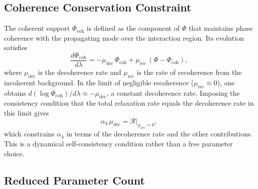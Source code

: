 \documentclass[12pt,a4paper]{article}
\theoremstyle{remark}
\newcommand{\Rcal}{\mathcal{R}}
\begin{document}
\subsection{Coherence Conservation Constraint}

The coherent support $\Phi_{\mathrm{coh}}$ is defined as the component of $\Phi$
that maintains phase coherence with the propagating mode over the interaction
region. Its evolution satisfies
\begin{equation}
\frac{d\Phi_{\mathrm{coh}}}{d\lambda} = -\mu_{\mathrm{dec}}\,\Phi_{\mathrm{coh}} + \mu_{\mathrm{rec}}\,(\Phi - \Phi_{\mathrm{coh}}),
\end{equation}
where $\mu_{\mathrm{dec}}$ is the decoherence rate and $\mu_{\mathrm{rec}}$ is
the rate of recoherence from the incoherent background. In the limit of
negligible recoherence ($\mu_{\mathrm{rec}} \approx 0$), one obtains
$d(\log\Phi_{\mathrm{coh}})/d\lambda \approx -\mu_{\mathrm{dec}}$, a constant
decoherence rate. Imposing the consistency condition that the total relaxation
rate equals the decoherence rate in this limit gives
\begin{equation}
\alpha_4\,\mu_{\mathrm{dec}} = \Rcal\big|_{\mu_{\mathrm{rec}}=0},
\end{equation}
which constrains $\alpha_4$ in terms of the decoherence rate and the other
contributions. This is a dynamical self-consistency condition rather than a
free parameter choice.

\subsection{Reduced Parameter Count}
\end{document}
